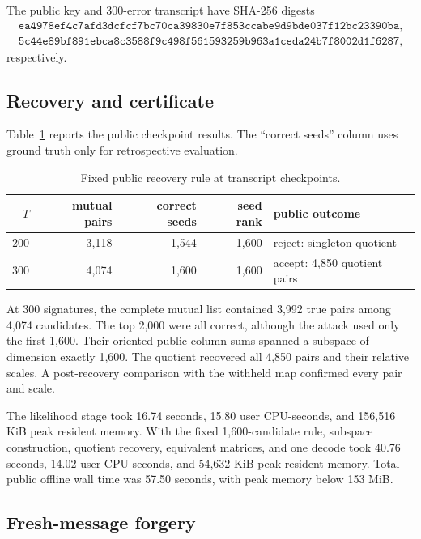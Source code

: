 \documentclass[11pt,a4paper]{article}
\begin{document}
The public key and 300-error transcript have SHA-256 digests
\begin{align*}
 \texttt{ea4978ef4c7afd3dcfcf7bc70ca39830e7f853ccabe9d9bde037f12bc23390ba},\\
 \texttt{5c44e89bf891ebca8c3588f9c498f561593259b963a1ceda24b7f8002d1f6287},
\end{align*}
respectively.

\subsection{Recovery and certificate}

Table~\ref{tab:recovery} reports the public checkpoint results.  The
``correct seeds'' column uses ground truth only for retrospective evaluation.

\begin{table}[ht]
\centering
\caption{Fixed public recovery rule at transcript checkpoints.}
\label{tab:recovery}
\small
\begin{tabular}{rrrrl}
\toprule
$T$ & mutual pairs & correct seeds & seed rank & public outcome\\
\midrule
200 & 3,118 & 1,544 & 1,600 & reject: singleton quotient\\
300 & 4,074 & 1,600 & 1,600 & accept: 4,850 quotient pairs\\
\bottomrule
\end{tabular}
\end{table}

At 300 signatures, the complete mutual list contained 3,992 true pairs among
4,074 candidates.  The top 2,000 were all correct, although the attack used
only the first 1,600.  Their oriented public-column sums spanned a subspace
of dimension exactly 1,600.  The quotient recovered all 4,850 pairs
and their relative scales.  A post-recovery comparison with the withheld map confirmed every pair and
scale.

The likelihood stage took 16.74 seconds, 15.80 user CPU-seconds, and
156,516 KiB peak resident memory.  With the fixed 1,600-candidate rule,
subspace construction, quotient recovery, equivalent matrices, and one
decode took 40.76 seconds, 14.02 user CPU-seconds, and 54,632 KiB peak
resident memory.  Total public offline wall time was 57.50 seconds, with peak
memory below 153 MiB.

\subsection{Fresh-message forgery}
\end{document}

